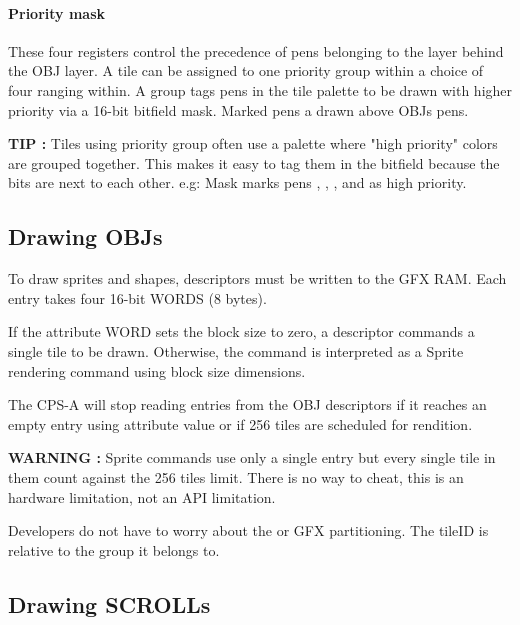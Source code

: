 \paragraph{Priority mask}
These four registers control the precedence of pens belonging to the layer behind the OBJ layer. A tile can be assigned to one priority group within a choice of four ranging within\icode{[0-3]}. A group tags pens in the tile palette to be drawn with higher priority via a 16-bit bitfield mask. Marked pens a drawn above OBJs pens.



 

\textbf{TIP :} Tiles using priority group often use a palette where "high priority" colors are grouped together. This makes it easy to tag them in the bitfield because the bits are next to each other. e.g: Mask  marks pens , , , and  as high priority.




\subsection{Drawing OBJs}
To draw sprites and shapes, descriptors must be written to the GFX RAM. Each entry takes four 16-bit WORDS (8 bytes).

 


  

If the attribute WORD sets the block size to zero, a descriptor commands a single tile to be drawn. Otherwise, the command is interpreted as a Sprite rendering command using block size dimensions.

The CPS-A will stop reading entries from the OBJ descriptors if it reaches an empty entry using attribute value  or if 256 tiles are scheduled for rendition.

\textbf{WARNING :} Sprite commands use only a single entry but every single tile in them count against the 256 tiles limit. There is no way to cheat, this is an hardware limitation, not an API limitation.


Developers do not have to worry about the  or GFX partitioning. The tileID is relative to the group it belongs to.

\subsection{Drawing SCROLLs}

